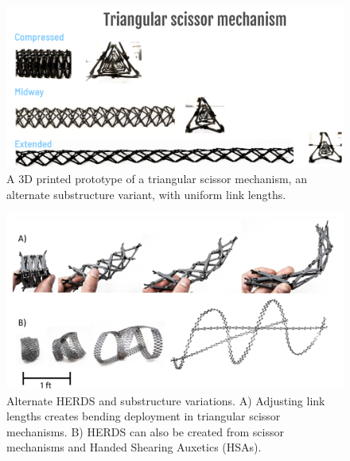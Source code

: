 \documentclass[11pt, a4paper]{article}
\begin{document}
\begin{figure}
\centering
\includegraphics[width=\linewidth]{figures-sup/tri-scissor-mechanism.png}
\centering
\caption{A 3D printed prototype of a triangular scissor mechanism, an alternate substructure variant, with uniform link lengths.}
\label{fig:tri-scissor}
\end{figure}

\begin{figure}
\centering
\includegraphics[width=\linewidth]{figures-sup/alternate Herd and scissor.png}
\centering
\caption{Alternate HERDS and substructure variations. A) Adjusting link lengths creates bending deployment in triangular scissor mechanisms. B) HERDS can also be created from scissor mechanisms and Handed Shearing Auxetics (HSAs).}
\label{fig:bending HERDS}
\end{figure}
\end{document}
